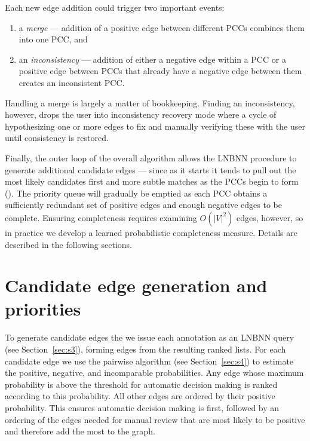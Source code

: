 Each new edge addition could trigger two important events:
\begin{enumerate}[label={(\arabic*)}]

    \item a \emph{merge} --- addition of a positive edge between different
      PCCs combines them into one PCC, and

    \item an \emph{inconsistency} --- addition of either a negative edge
      within a PCC or a positive edge between PCCs that already have a negative
      edge between them creates an inconsistent PCC.

\end{enumerate}
Handling a merge is largely a matter of bookkeeping.
Finding an inconsistency, however, drops the user into inconsistency recovery
  mode where a cycle of hypothesizing one or more edges to fix and manually
  verifying these with the user until consistency is restored.

Finally, the outer loop of the overall algorithm allows the LNBNN procedure to
  generate additional candidate edges --- since as it starts it tends to pull
  out the most likely candidates first and more subtle matches as the PCCs begin
  to form ().
The priority queue will gradually be emptied as each PCC obtains a
  sufficiently redundant set of positive edges and enough negative edges to be
  complete.
Ensuring completeness requires examining $O(|V|^2)$ edges, however, so in
  practice we develop a learned probabilistic completeness measure.
Details are described in the following sections.




\section{Candidate edge generation and priorities}\label{sec:cand}
To generate candidate edges the we issue each annotation as an LNBNN query
  (see Section~\ref{sec:s3}), forming edges from the resulting ranked lists.
For each candidate edge we use the pairwise algorithm (see
  Section~\ref{sec:s4}) to estimate the positive, negative, and incomparable
  probabilities.
Any edge whose maximum probability is above the threshold for automatic
  decision making is ranked according to this probability.
All other edges are ordered by their positive probability.
This ensures automatic decision making is first, followed by an ordering of
  the edges needed for manual review that are most likely to be positive and
  therefore add the most to the graph.

